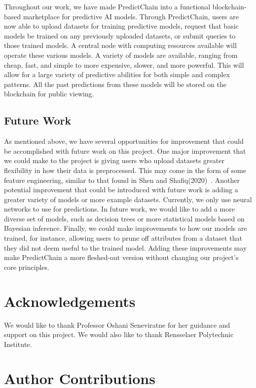 \documentclass{ledger}
\begin{document}
Throughout our work, we have made PredictChain into a functional blockchain-based marketplace for predictive AI models.
Through PredictChain, users are now able to upload datasets for training predictive models, request that basic models be
trained on any previously uploaded datasets, or submit queries to those trained models. A central node with computing
resources available will operate these various models. A variety of
models are available, ranging from cheap, fast, and simple to more expensive, slower, and more powerful. This will allow
for a large variety of predictive abilities for both simple and complex patterns.  All the past predictions from these
models will be stored on the blockchain for public viewing.

\subsection{Future Work}

As mentioned above, we have several opportunities for improvement that could be accomplished with future work on this
project.  One major improvement that we could make to the project is giving users who upload datasets greater flexibility
in how their data is preprocessed.  This may come in the form of some feature engineering, similar to that found in Shen
and Shafiq(2020)~\cite{deepPrediction}.  Another potential improvement that could be introduced with future work is adding
a greater variety of models or more example datasets.  Currently, we only use neural networks to use for predictions.
In future work, we would like to add a more diverse set of models, such as decision trees or more statistical models based
on Bayesian inference.  Finally, we could make improvements to how our models are trained, for instance, allowing users
to prune off attributes from a dataset that they did not deem useful to the trained model.  Adding these improvements may
make PredictChain a more fleshed-out version without changing our project's core principles.

\ledgernotes

\section*{Acknowledgements} 

We would like to thank Professor Oshani Seneviratne for her guidance and support on this project.
We would also like to thank Rensselaer Polytechnic Institute.

\section*{Author Contributions}
\end{document}
